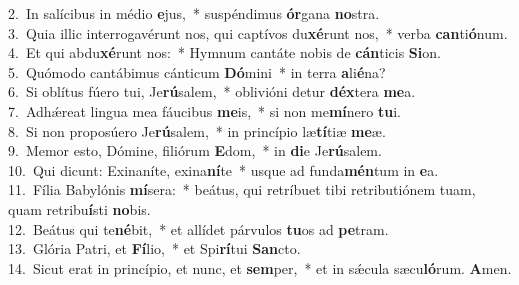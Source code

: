 {2.~}In salícibus in médio \textbf{e}jus,~* suspéndimus \textbf{ór}gana \textbf{no}stra.\\
{3.~}Quia illic interrogavérunt nos, qui captívos du\textbf{xé}runt nos,~* verba \textbf{can}ti\textbf{ó}num.\\
{4.~}Et qui abdu\textbf{xé}runt nos:~* Hymnum cantáte nobis de \textbf{cán}ticis \textbf{Si}on.\\
{5.~}Quómodo cantábimus cánticum \textbf{Dó}mini~* in terra \textbf{a}li\textbf{é}na?\\
{6.~}Si oblítus fúero tui, Je\textbf{rú}salem,~* oblivióni detur \textbf{déx}tera \textbf{me}a.\\
{7.~}Adhǽreat lingua mea fáucibus \textbf{me}is,~* si non me\textbf{mí}nero \textbf{tu}i.\\
{8.~}Si non proposúero Je\textbf{rú}salem,~* in princípio læ\textbf{tí}tiæ \textbf{me}æ.\\
{9.~}Memor esto, Dómine, filiórum \textbf{E}dom,~* in \textbf{di}e Je\textbf{rú}salem.\\
{10.~}Qui dicunt: Exinaníte, exina\textbf{ní}te~* usque ad funda\textbf{mén}tum in \textbf{e}a.\\
{11.~}Fília Babylónis \textbf{mí}sera:~* beátus, qui retríbuet tibi retributiónem tuam, quam retribu\textbf{í}sti \textbf{no}bis.\\
{12.~}Beátus qui te\textbf{né}bit,~* et allídet párvulos \textbf{tu}os ad \textbf{pe}tram.\\
{13.~}Glória Patri, et \textbf{Fí}lio,~* et Spi\textbf{rí}tui \textbf{San}cto.\\
{14.~}Sicut erat in princípio, et nunc, et \textbf{sem}per,~* et in sǽcula sæcu\textbf{ló}rum. \textbf{A}men.\\
